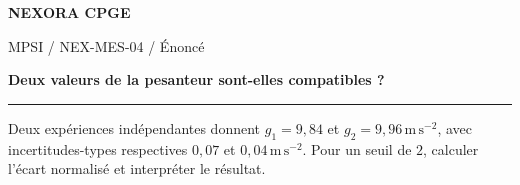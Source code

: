 \documentclass[11pt,a4paper]{article}
\begin{document}
{\small\bfseries\color{nexorablue} NEXORA CPGE}\par
{\small MPSI / NEX-MES-04 / Énoncé}\par
{\LARGE\bfseries Deux valeurs de la pesanteur sont-elles compatibles ?}\par
\vspace{0.25em}\hrule\vspace{0.6em}

Deux expériences indépendantes donnent $g_1=9{,}84$ et $g_2=9{,}96\,\mathrm{m\,s^{-2}}$, avec incertitudes-types respectives $0{,}07$ et $0{,}04\,\mathrm{m\,s^{-2}}$. Pour un seuil de $2$, calculer l’écart normalisé et interpréter le résultat.
\end{document}
